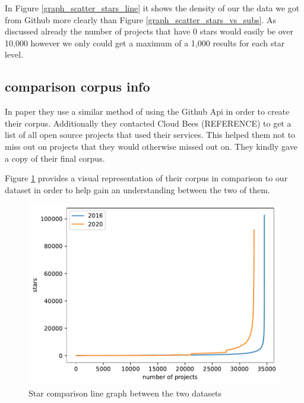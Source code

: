 \documentclass[twoside,12pt,titlepage,a4paper]{article}
\begin{document}
In Figure \ref{graph_scatter_stars_line} it shows the density of our the data we got from Github more clearly than Figure \ref{graph_scatter_stars_vs_subs}. As discussed already the number of projects that have 0 stars would easily be over 10,000 however we only could get a maximum of a 1,000 results for each star level.

\vspace*{-0.05in}
\subsection{comparison corpus info}
\label{section:HiltonComaprisonCoprusTHing}
\vspace*{-0.05in}
In \citet{Hilton2016} paper they use a similar method of using the Github Api in order to create their corpus. Additionally they contacted Cloud Bees (REFERENCE) to get a list of all open source projects that used their services. This helped them not to miss out on projects that they would otherwise missed out on. They kindly gave a copy of their final corpus. 


Figure \ref{graph:line_comparison_hilton} provides a visual representation of their corpus in comparison to our dataset in order to help gain an understanding between the two of them. 

\begin{figure}[!ht]
  \centering
  \includegraphics[width=\textwidth]{../src/results/comparison_corpus.pdf}
  \caption[alt text]{Star comparison line graph between the two datasets}
  \label{graph:line_comparison_hilton}
\end{figure}
\end{document}
